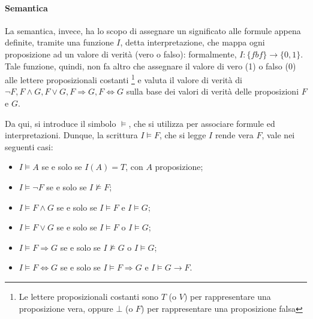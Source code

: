\paragraph*{Semantica}
La semantica, invece, ha lo scopo di assegnare un significato alle formule appena definite, tramite una funzione \(I\), detta interpretazione, che mappa ogni proposizione ad un valore di verità (vero o falso): formalmente, \(I: \{fbf\} \to \{0,1\}\). Tale funzione, quindi, non fa altro che assegnare il valore di vero (1) o falso (0) alle lettere proposizionali costanti \footnote{Le lettere proposizionali costanti sono \(T\) (o \(V\)) per rappresentare una proposizione vera, oppure \(\bot\) (o \(F\)) per rappresentare una proposizione falsa} e valuta il valore di verità di \(\lnot F, F \wedge G, F \vee G, F \Rightarrow G, F \Leftrightarrow G\) sulla base dei valori di verità delle proposizioni \(F\) e \(G\). 

Da qui, si introduce il simbolo \(\vDash\), che si utilizza per associare formule ed interpretazioni. Dunque, la scrittura \(I \vDash F\), che si legge \(I\) rende vera \(F\), vale nei seguenti casi:
\begin{itemize}
  \item \(I \vDash A\) se e solo se \(I(A) = T\), con \(A\) proposizione;
  \item \(I \vDash \lnot F\) se e solo se \(I \nvDash F\);
  \item \(I \vDash F \wedge G\) se e solo se \(I\vDash F\) e \(I \vDash G\);
  \item \(I \vDash F \vee G\) se e solo se \(I \vDash F\) o \(I \vDash G\);
  \item \(I \vDash F \Rightarrow G\) se e solo se \(I \nvDash G\) o \(I \vDash G\);
  \item \(I \vDash F \Leftrightarrow G\) se e solo se \(I \vDash F\Rightarrow G\) e \(I \vDash G \rightarrow F\).
\end{itemize}

